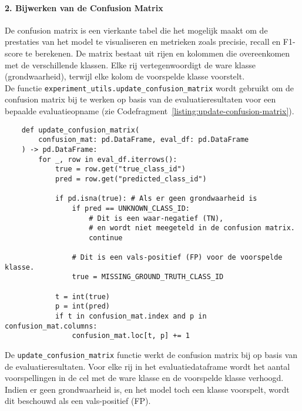 \paragraph{2. Bijwerken van de Confusion Matrix}
De confusion matrix is een vierkante tabel die het mogelijk maakt om de prestaties van het model te visualiseren en metrieken zoals precisie, recall en F1-score te berekenen.
De matrix bestaat uit rijen en kolommen die overeenkomen met de verschillende klassen.
Elke rij vertegenwoordigt de ware klasse (grondwaarheid), terwijl elke kolom de voorspelde klasse voorstelt.\\
De functie \texttt{experiment\_utils.update\_confusion\_matrix} wordt gebruikt om de confusion matrix bij 
te werken op basis van de evaluatieresultaten voor een bepaalde evaluatieopname (zie Codefragment~\ref{listing:update-confusion-matrix}).

\begin{listing}[H]
  \begin{verbatim}
    def update_confusion_matrix(
        confusion_mat: pd.DataFrame, eval_df: pd.DataFrame
    ) -> pd.DataFrame:
        for _, row in eval_df.iterrows():
            true = row.get("true_class_id")
            pred = row.get("predicted_class_id")

            if pd.isna(true): # Als er geen grondwaarheid is
                if pred == UNKNOWN_CLASS_ID:
                    # Dit is een waar-negatief (TN), 
                    # en wordt niet meegeteld in de confusion matrix.
                    continue

                # Dit is een vals-positief (FP) voor de voorspelde klasse.
                true = MISSING_GROUND_TRUTH_CLASS_ID

            t = int(true)
            p = int(pred)
            if t in confusion_mat.index and p in confusion_mat.columns:
                confusion_mat.loc[t, p] += 1
  \end{verbatim}
  \caption[Functie voor het bijwerken van de confusion matrix]{
      \label{listing:update-confusion-matrix}
        De \texttt{update\_confusion\_matrix} functie werkt de confusion matrix bij op basis van de evaluatieresultaten.
        Voor elke rij in het evaluatiedataframe wordt het aantal voorspellingen in de cel met de ware klasse en de voorspelde klasse verhoogd.
        Indien er geen grondwaarheid is, en het model toch een klasse voorspelt, wordt dit beschouwd als een vals-positief (FP).
      }
\end{listing}

